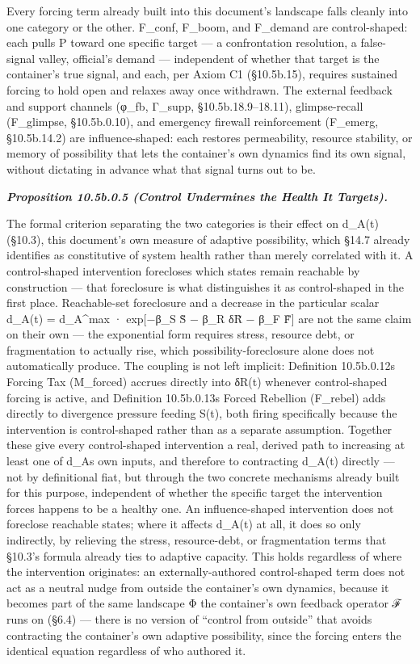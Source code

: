 \documentclass[
]{article}
\begin{document}
Every forcing term already built into this document's landscape falls
cleanly into one category or the other. F\_conf, F\_boom, and F\_demand
are control-shaped: each pulls P toward one specific target --- a
confrontation resolution, a false-signal valley, official's demand ---
independent of whether that target is the container's true signal, and
each, per Axiom C1 (§10.5b.15), requires sustained forcing to hold open
and relaxes away once withdrawn. The external feedback and support
channels (φ\_fb, Γ\_supp, §10.5b.18.9--18.11), glimpse-recall
(F\_glimpse, §10.5b.0.10), and emergency firewall reinforcement
(F\_emerg, §10.5b.14.2) are influence-shaped: each restores
permeability, resource stability, or memory of possibility that lets the
container's own dynamics find its own signal, without dictating in
advance what that signal turns out to be.

\emph{\textbf{Proposition 10.5b.0.5 (Control Undermines the Health It
Targets).}}

The formal criterion separating the two categories is their effect on
d\_A(t) (§10.3), this document's own measure of adaptive possibility,
which §14.7 already identifies as constitutive of system health rather
than merely correlated with it. A control-shaped intervention forecloses
which states remain reachable by construction --- that foreclosure is
what distinguishes it as control-shaped in the first place.
Reachable-set foreclosure and a decrease in the particular scalar
d\_A(t) = d\_A\^{}max · exp{[}−β\_S S̃ − β\_R δR̃ − β\_F F̃{]} are not the
same claim on their own --- the exponential form requires stress,
resource debt, or fragmentation to actually rise, which
possibility-foreclosure alone does not automatically produce. The
coupling is not left implicit: Definition 10.5b.0.12\textquotesingle s
Forcing Tax (M\_forced) accrues directly into δR(t) whenever
control-shaped forcing is active, and Definition
10.5b.0.13\textquotesingle s Forced Rebellion (F\_rebel) adds directly
to divergence pressure feeding S(t), both firing specifically because
the intervention is control-shaped rather than as a separate assumption.
Together these give every control-shaped intervention a real, derived
path to increasing at least one of d\_A\textquotesingle s own inputs,
and therefore to contracting d\_A(t) directly --- not by definitional
fiat, but through the two concrete mechanisms already built for this
purpose, independent of whether the specific target the intervention
forces happens to be a healthy one. An influence-shaped intervention
does not foreclose reachable states; where it affects d\_A(t) at all, it
does so only indirectly, by relieving the stress, resource-debt, or
fragmentation terms that §10.3's formula already ties to adaptive
capacity. This holds regardless of where the intervention originates: an
externally-authored control-shaped term does not act as a neutral nudge
from outside the container's own dynamics, because it becomes part of
the same landscape Φ the container's own feedback operator ℱ runs on
(§6.4) --- there is no version of ``control from outside'' that avoids
contracting the container's own adaptive possibility, since the forcing
enters the identical equation regardless of who authored it.
\end{document}

